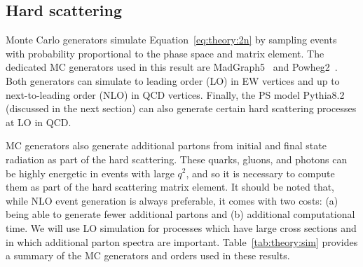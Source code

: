 \subsection{Hard scattering}

Monte Carlo generators simulate Equation~\ref{eq:theory:2n} by sampling events with probability proportional to the phase space and matrix element.
The dedicated MC generators used in this result are MadGraph5~\cite{mg5,fxfx} and Powheg2~\cite{powheg}.
Both generators can simulate to leading order (LO) in EW vertices and up to next-to-leading order (NLO) in QCD vertices.
Finally, the PS model Pythia8.2~\cite{pythia} (discussed in the next section) can also generate certain hard scattering processes at LO in QCD.

MC generators also generate additional partons from initial and final state radiation as part of the hard scattering.
These quarks, gluons, and photons can be highly energetic in events with large $q^2$, and so it is necessary to compute them as part of the hard scattering matrix element.  
It should be noted that, while NLO event generation is always preferable, it comes with two costs: (a) being able to generate fewer additional partons and (b) additional computational time.
We will use LO simulation for processes which have large cross sections and in which additional parton spectra are important.
Table~\ref{tab:theory:sim} provides a summary of the MC generators and orders used in these results.

